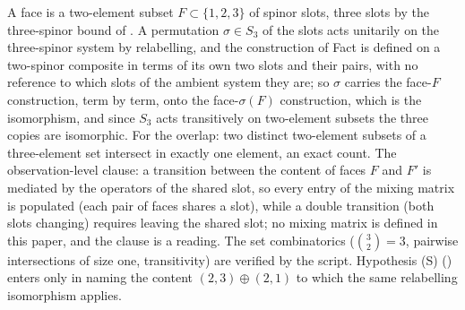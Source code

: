 A face is a two-element subset $F \subset \{1, 2, 3\}$ of spinor slots, three slots by the three-spinor bound of . A permutation $\sigma \in S_{3}$ of the slots acts unitarily on the three-spinor system by relabelling, and the construction of Fact  is defined on a two-spinor composite in terms of its own two slots and their pairs, with no reference to which slots of the ambient system they are; so $\sigma$ carries the face-$F$ construction, term by term, onto the face-$\sigma(F)$ construction, which is the isomorphism, and since $S_{3}$ acts transitively on two-element subsets the three copies are isomorphic. For the overlap: two distinct two-element subsets of a three-element set intersect in exactly one element, an exact count. The observation-level clause: a transition between the content of faces $F$ and $F'$ is mediated by the operators of the shared slot, so every entry of the mixing matrix is populated (each pair of faces shares a slot), while a double transition (both slots changing) requires leaving the shared slot; no mixing matrix is defined in this paper, and the clause is a reading. The set combinatorics ($\binom{3}{2} = 3$, pairwise intersections of size one, transitivity) are verified by the script. Hypothesis (S) () enters only in naming the content $(2,3) \oplus (2,1)$ to which the same relabelling isomorphism applies.
